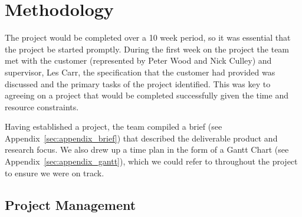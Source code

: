 \section{Methodology}

The project would be completed over a 10 week period, so it was essential that the project be started promptly. During the first week on the project the team met with the customer (represented by Peter Wood and Nick Culley) and supervisor, Les Carr, the specification that the customer had provided was discussed and the primary tasks of the project identified. This was key to agreeing on a project that would be completed successfully given the time and resource constraints.

Having established a project, the team compiled a brief (see Appendix~\ref{sec:appendix_brief}) that described the deliverable product and research focus. We also drew up a time plan in the form of a Gantt Chart (see Appendix~\ref{sec:appendix_gantt}), which we could refer to throughout the project to ensure we were on track.

\subsection{Project Management}
 
